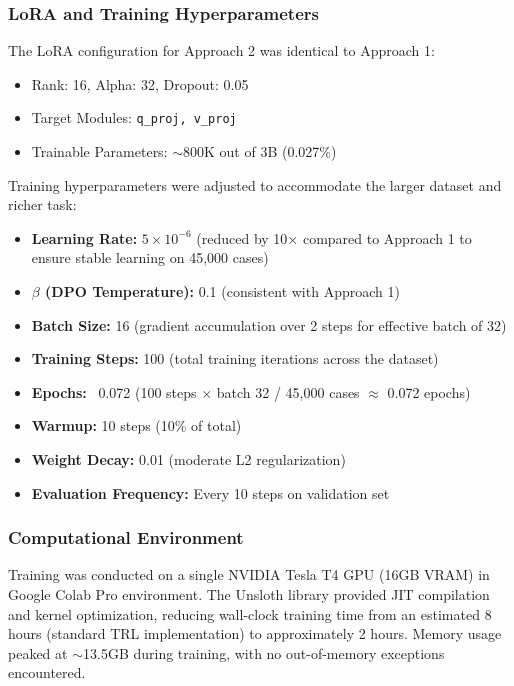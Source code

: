 \documentclass[conference]{IEEEtran}
\begin{document}
\subsubsection{LoRA and Training Hyperparameters}
The LoRA configuration for Approach 2 was identical to Approach 1:
\begin{itemize}
    \item Rank: 16, Alpha: 32, Dropout: 0.05
    \item Target Modules: \texttt{q\_proj, v\_proj}
    \item Trainable Parameters: $\sim$800K out of 3B (0.027\%)
\end{itemize}

Training hyperparameters were adjusted to accommodate the larger dataset and richer task:
\begin{itemize}
    \item \textbf{Learning Rate:} $5 \times 10^{-6}$ (reduced by 10× compared to Approach 1 to ensure stable learning on 45,000 cases)
    \item \textbf{$\beta$ (DPO Temperature):} 0.1 (consistent with Approach 1)
    \item \textbf{Batch Size:} 16 (gradient accumulation over 2 steps for effective batch of 32)
    \item \textbf{Training Steps:} 100 (total training iterations across the dataset)
    \item \textbf{Epochs:} ~0.072 (100 steps $\times$ batch 32 / 45,000 cases $\approx$ 0.072 epochs)
    \item \textbf{Warmup:} 10 steps (10\% of total)
    \item \textbf{Weight Decay:} 0.01 (moderate L2 regularization)
    \item \textbf{Evaluation Frequency:} Every 10 steps on validation set
\end{itemize}

\subsubsection{Computational Environment}
Training was conducted on a single NVIDIA Tesla T4 GPU (16GB VRAM) in Google Colab Pro environment. The Unsloth library provided JIT compilation and kernel optimization, reducing wall-clock training time from an estimated 8 hours (standard TRL implementation) to approximately 2 hours. Memory usage peaked at $\sim$13.5GB during training, with no out-of-memory exceptions encountered.
\end{document}
